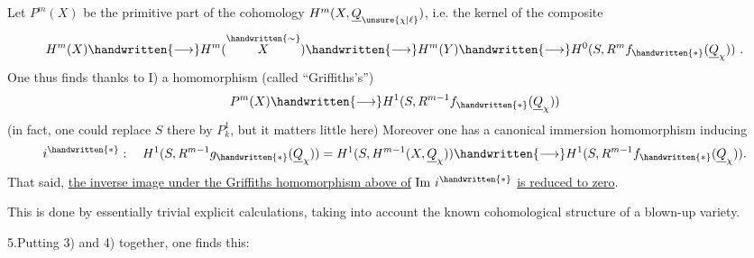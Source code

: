 Let $P^m(X)$ be the primitive part of the cohomology $H^m(X,\underline{Q}_{\unsure{\chi|\ell}})$, i.e. the kernel of the composite
\[
H^m(X)\handwritten{\longrightarrow}H^m(\overset{\handwritten{\sim}}{X})\handwritten{\longrightarrow}H^m(Y)\handwritten{\longrightarrow}H^0(S,R^m f_{\handwritten{*}}(\underline{Q}_{\chi}))\ .
\]
One thus finds thanks to I) a homomorphism (called ``Griffiths's'')
\[
P^m(X)\handwritten{\longrightarrow}H^1(S,R^{m-1}f_{\handwritten{*}}(\underline{Q}_{\chi}))
\]
(in fact, one could replace $S$ there by $P^1_k$, but  it matters little here)
Moreover  one has a canonical immersion homomorphism
inducing
\[
i^{\handwritten{*}}:\quad H^1(S,R^{m-1}g_{\handwritten{*}}(\underline{Q}_{\chi}))=H^1(S,H^{m-1}(X,\underline{Q}_{\chi}))\handwritten{\longrightarrow}H^1(S,R^{m-1}f_{\handwritten{*}}(\underline{Q}_{\chi})).
\]
That said, \uline{the inverse image under the Griffiths homomorphism above of} $\mathrm{Im}\ i^{\handwritten{*}}$ \uline{is reduced to zero}.

This is done by essentially trivial explicit calculations, taking into account the known cohomological structure of a blown-up variety.

5.\quad Putting 3) and 4) together, one finds this:

